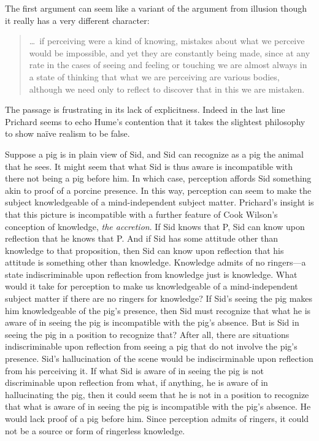 The first argument can seem like a variant of the argument from illusion though it really has a very different character:
\begin{quote}
	\ldots\ if perceiving were a kind of knowing, mistakes about what we perceive would be impossible, and yet they are constantly being made, since at any rate in the cases of seeing and feeling or touching we are almost always in a state of thinking that what we are perceiving are various bodies, although we need only to reflect to discover that in this we are mistaken. \citep[11]{Prichard:1938ve}
\end{quote}
The passage is frustrating in its lack of explicitness. Indeed in the last line Prichard seems to echo Hume’s \citeyearpar[§XII]{Hume:1740lr} contention that it takes the slightest philosophy to show naïve realism to be false. 

Suppose a pig is in plain view of Sid, and Sid can recognize as a pig the animal that he sees. It might seem that what Sid is thus aware is incompatible with there not being a pig before him. In which case, perception affords Sid something akin to proof of a porcine presence. In this way, perception can seem to make the subject knowledgeable of a mind-independent subject matter. Prichard's insight is that this picture is incompatible with a further feature of Cook Wilson's conception of knowledge, \emph{the accretion}. %
If Sid knows that P, Sid can know upon reflection that he knows that P. And if Sid has some attitude other than knowledge to that proposition, then Sid can know upon reflection that his attitude is something other than knowledge. Knowledge admits of no ringers---a state indiscriminable upon reflection from knowledge just is knowledge. What would it take for perception to make us knowledgeable of a mind-independent subject matter if there are no ringers for knowledge? If Sid's seeing the pig makes him knowledgeable of the pig's presence, then Sid must recognize that what he is aware of in seeing the pig is incompatible with the pig's absence. But is Sid in seeing the pig in a position to recognize that? After all, there are situations indiscriminable upon reflection from seeing a pig that do not involve the pig's presence. Sid's hallucination of the scene would be indiscirminable upon reflection from his perceiving it. If what Sid is aware of in seeing the pig is not discriminable upon reflection from what, if anything, he is aware of in hallucinating the pig, then it could seem that he is not in a position to recognize that what is aware of in seeing the pig is incompatible with the pig's absence. He would lack proof of a pig before him. Since perception admits of ringers, it could not be a source or form of ringerless knowledge.

